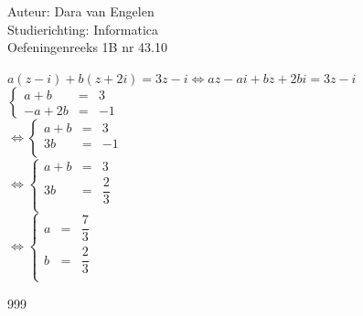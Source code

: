 \documentclass[a4paper]{article}
\begin{document}
  
\noindent \large Auteur: Dara van Engelen \\
\noindent \large Studierichting: Informatica\\
\noindent \large Oefeningenreeks 1B nr 43.10\\

\medskip

\normalsize

$ a(z-i) + b(z+2i) = 3z-i \Leftrightarrow az - ai + bz + 2bi = 3z -i $\\

$\left\{
	\begin{array}{lll} 
	    a+b &=& 3 \\
		-a+2b &=& -1
	\end{array}
\right .$\\

$\Leftrightarrow\left\{
	\begin{array}{lll} 
		a+b &=& 3\\
		3b &=& -1\\
	\end{array}
\right .$\\

$\Leftrightarrow\left\{
	\begin{array}{lll} 
		a+b &=& 3\\
		3b &=& \dfrac{2}{3}\\
	\end{array}
\right .$\\

$\Leftrightarrow\left\{
	\begin{array}{lll} 
		a &=& \dfrac{7}{3}\\
		b &=& \dfrac{2}{3}\\
	\end{array}
\right .$\\



\begin{thebibliography}{999}
\end{thebibliography}
\end{document}
